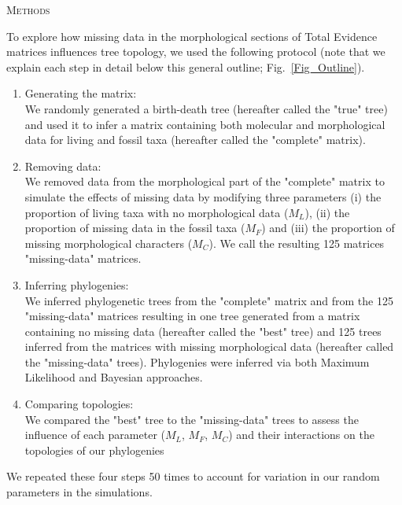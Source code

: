 \documentclass[12pt,letterpaper]{article}
\renewcommand{\section}[1]{%
\bigskip
\begin{center}
\begin{Large}
\normalfont\scshape #1
\medskip
\end{Large}
\end{center}}
\begin{document}
\newpage

\section{Methods}
To explore how missing data in the morphological sections of Total Evidence matrices influences tree topology, we used the following protocol (note that we explain each step in detail below this general outline; Fig.~\ref{Fig_Outline}).
\begin{enumerate}
\item{Generating the matrix:} \label{step:generate_matrix} \\
We randomly generated a birth-death tree (hereafter called the "true" tree) and used it to infer a matrix containing both molecular and morphological data for living and fossil taxa (hereafter called the "complete" matrix).
\item{Removing data:} \label{step:remove_data} \\
We removed data from the morphological part of the "complete" matrix to simulate the effects of missing data by modifying three parameters (i) the proportion of living taxa with no morphological data ($M_{L}$), (ii) the proportion of missing data in the fossil taxa ($M_{F}$) and (iii) the proportion of missing morphological characters ($M_{C}$). We call the resulting 125 matrices "missing-data" matrices.
\item{Inferring phylogenies:} \label{step:build_phylo} \\
We inferred phylogenetic trees from the "complete" matrix and from the 125 "missing-data" matrices resulting in one tree generated from a matrix containing no missing data (hereafter called the "best" tree) and 125 trees inferred from the matrices with missing morphological data (hereafter called the "missing-data" trees). Phylogenies were inferred via both Maximum Likelihood and Bayesian approaches.
\item{Comparing topologies:} \label{step:compare_topo} \\
We compared the "best" tree to the "missing-data" trees to assess the influence of each parameter ($M_{L}$, $M_{F}$, $M_{C}$) and their interactions on the topologies of our phylogenies
\end{enumerate}
We repeated these four steps 50 times to account for variation in our random parameters in the simulations.

\end{document}
